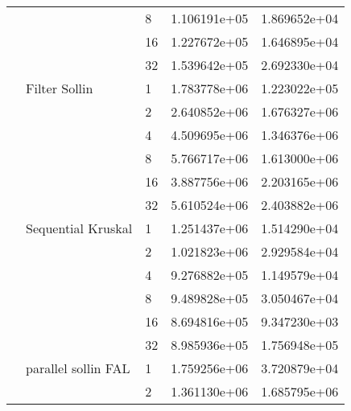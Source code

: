 \begin{tabular}{lllrr}
                                                       &                     & 8  &  1.106191e+05 &  1.869652e+04 \\
                                                       &                     & 16 &  1.227672e+05 &  1.646895e+04 \\
                                                       &                     & 32 &  1.539642e+05 &  2.692330e+04 \\
                                                       & Filter Sollin & 1  &  1.783778e+06 &  1.223022e+05 \\
                                                       &                     & 2  &  2.640852e+06 &  1.676327e+06 \\
                                                       &                     & 4  &  4.509695e+06 &  1.346376e+06 \\
                                                       &                     & 8  &  5.766717e+06 &  1.613000e+06 \\
                                                       &                     & 16 &  3.887756e+06 &  2.203165e+06 \\
                                                       &                     & 32 &  5.610524e+06 &  2.403882e+06 \\
                                                       & Sequential Kruskal & 1  &  1.251437e+06 &  1.514290e+04 \\
                                                       &                     & 2  &  1.021823e+06 &  2.929584e+04 \\
                                                       &                     & 4  &  9.276882e+05 &  1.149579e+04 \\
                                                       &                     & 8  &  9.489828e+05 &  3.050467e+04 \\
                                                       &                     & 16 &  8.694816e+05 &  9.347230e+03 \\
                                                       &                     & 32 &  8.985936e+05 &  1.756948e+05 \\
                                                       & parallel sollin FAL & 1  &  1.759256e+06 &  3.720879e+04 \\
                                                       &                     & 2  &  1.361130e+06 &  1.685795e+06 \\

\end{tabular}
